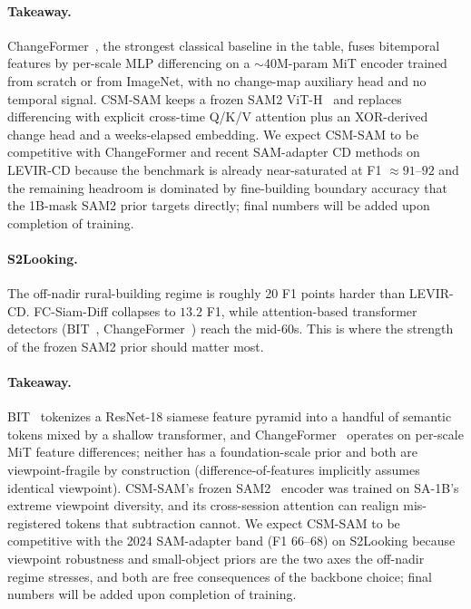 \paragraph{Takeaway.} ChangeFormer~\cite{bandara2022changeformer},
the strongest classical baseline in the table, fuses bitemporal
features by per-scale MLP differencing on a $\sim$40M-param MiT
encoder trained from scratch or from ImageNet, with no change-map
auxiliary head and no temporal signal. CSM-SAM keeps a frozen SAM2
ViT-H~\cite{ravi2024sam2} and replaces differencing with explicit
cross-time Q/K/V attention plus an XOR-derived change head and a
weeks-elapsed embedding. We expect CSM-SAM to be competitive with
ChangeFormer and recent SAM-adapter CD methods on LEVIR-CD because the
benchmark is already near-saturated at F1 $\approx 91$--$92$ and the
remaining headroom is dominated by fine-building boundary accuracy
that the 1B-mask SAM2 prior targets directly; final numbers will be
added upon completion of training.


\paragraph{S2Looking.} The off-nadir rural-building regime is
roughly 20 F1 points harder than LEVIR-CD. FC-Siam-Diff collapses to
$13.2$ F1, while attention-based transformer detectors
(BIT~\cite{chen2021bit},
ChangeFormer~\cite{bandara2022changeformer}) reach the mid-60s. This
is where the strength of the frozen SAM2 prior should matter most.

\paragraph{Takeaway.} BIT~\cite{chen2021bit} tokenizes a ResNet-18
siamese feature pyramid into a handful of semantic tokens mixed by a
shallow transformer, and ChangeFormer~\cite{bandara2022changeformer}
operates on per-scale MiT feature differences; neither has a
foundation-scale prior and both are viewpoint-fragile by construction
(difference-of-features implicitly assumes identical viewpoint).
CSM-SAM's frozen SAM2~\cite{ravi2024sam2} encoder was trained on
SA-1B's extreme viewpoint diversity, and its cross-session attention
can realign mis-registered tokens that subtraction cannot. We expect
CSM-SAM to be competitive with the 2024 SAM-adapter band (F1
$66$--$68$) on S2Looking because viewpoint robustness and small-object
priors are the two axes the off-nadir regime stresses, and both are
free consequences of the backbone choice; final numbers will be added
upon completion of training.

